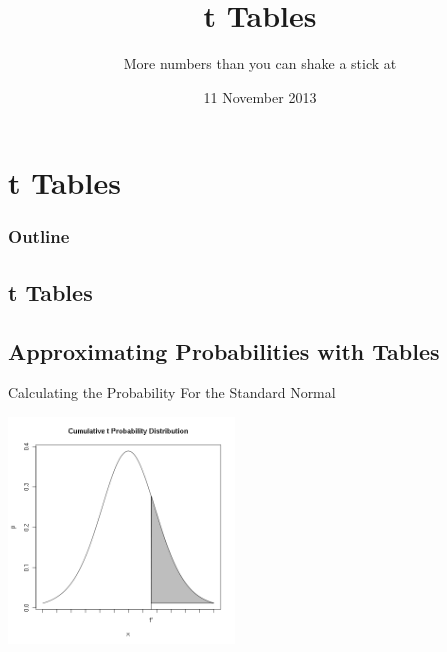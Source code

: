 
\section{t Tables}

\title{t Tables}
\subtitle{More numbers than you can shake a stick at}

\date{11 November 2013}

\begin{frame}
  \titlepage
\end{frame}

\begin{frame}
  \frametitle{Outline}
  \tableofcontents[hideothersubsections,sectionstyle=show/hide]
\end{frame}


\subsection{t Tables}


\subsection{Approximating Probabilities with Tables}

\begin{frame}{Calculating the Probability For the Standard Normal}

  \includegraphics[width=6cm]{img/tcummulativeDist}
  
\end{frame}

